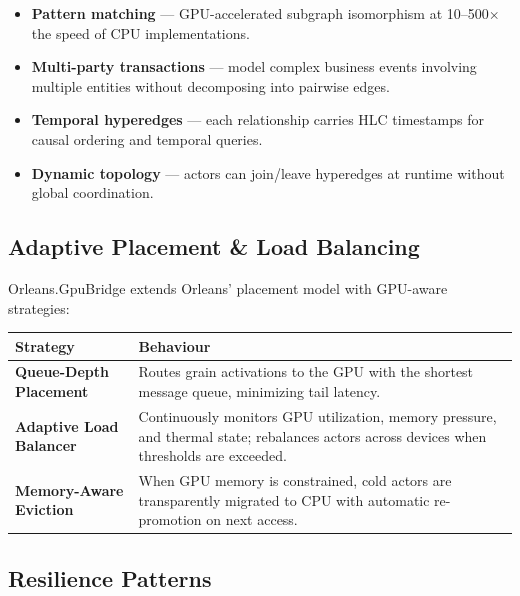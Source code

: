 \documentclass[11pt,a4paper]{article}
\begin{document}
\begin{tcolorbox}[keybox={Hypergraph Advantages}]
\begin{itemize}[leftmargin=1.2em, itemsep=3pt]
  \item \textbf{Pattern matching} --- GPU-accelerated subgraph isomorphism
        at 10--500$\times$ the speed of CPU implementations.
  \item \textbf{Multi-party transactions} --- model complex business events
        involving multiple entities without decomposing into pairwise edges.
  \item \textbf{Temporal hyperedges} --- each relationship carries HLC
        timestamps for causal ordering and temporal queries.
  \item \textbf{Dynamic topology} --- actors can join/leave hyperedges at
        runtime without global coordination.
\end{itemize}
\end{tcolorbox}

\subsection{Adaptive Placement \& Load Balancing}

Orleans.GpuBridge extends Orleans' placement model with GPU-aware strategies:

\vspace{0.5em}
\noindent
\renewcommand{\arraystretch}{1.2}
\begin{tabularx}{\textwidth}{>{\bfseries\color{brand}}l X}
\toprule
\textbf{Strategy} & \textbf{Behaviour} \\
\midrule
Queue-Depth Placement &
  Routes grain activations to the GPU with the shortest message queue,
  minimizing tail latency. \\
Adaptive Load Balancer &
  Continuously monitors GPU utilization, memory pressure, and thermal
  state; rebalances actors across devices when thresholds are exceeded. \\
Memory-Aware Eviction &
  When GPU memory is constrained, cold actors are transparently migrated
  to CPU with automatic re-promotion on next access. \\
\bottomrule
\end{tabularx}
\vspace{0.5em}

\subsection{Resilience Patterns}
\end{document}
